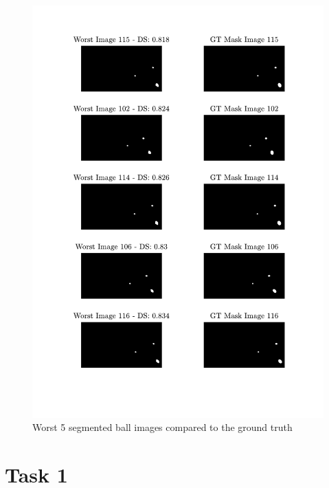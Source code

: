 \documentclass[conference]{IEEEtran}
\begin{document}
    \begin{figure}[htbp]
        \centering
        \includegraphics[width=\columnwidth]{figures/worst.pdf}
        \caption{Worst 5 segmented ball images compared to the ground truth\label{apx:worst}}
    \end{figure}

    \section{Task 1}
\end{document}

